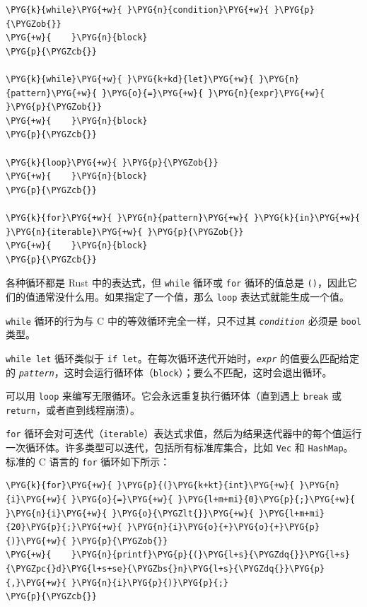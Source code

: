 \begin{Verbatim}[commandchars=\\\{\},breaklines=true,breakanywhere=true,fontsize=\codefont,xleftmargin=17bp]
\PYG{k}{while}\PYG{+w}{ }\PYG{n}{condition}\PYG{+w}{ }\PYG{p}{\PYGZob{}}
\PYG{+w}{    }\PYG{n}{block}
\PYG{p}{\PYGZcb{}}

\PYG{k}{while}\PYG{+w}{ }\PYG{k+kd}{let}\PYG{+w}{ }\PYG{n}{pattern}\PYG{+w}{ }\PYG{o}{=}\PYG{+w}{ }\PYG{n}{expr}\PYG{+w}{ }\PYG{p}{\PYGZob{}}
\PYG{+w}{    }\PYG{n}{block}
\PYG{p}{\PYGZcb{}}

\PYG{k}{loop}\PYG{+w}{ }\PYG{p}{\PYGZob{}}
\PYG{+w}{    }\PYG{n}{block}
\PYG{p}{\PYGZcb{}}

\PYG{k}{for}\PYG{+w}{ }\PYG{n}{pattern}\PYG{+w}{ }\PYG{k}{in}\PYG{+w}{ }\PYG{n}{iterable}\PYG{+w}{ }\PYG{p}{\PYGZob{}}
\PYG{+w}{    }\PYG{n}{block}
\PYG{p}{\PYGZcb{}}
\end{Verbatim}

各种循环都是 Rust 中的表达式，但 \texttt{while} 循环或 \texttt{for} 循环的值总是 \texttt{()}，因此它们的值通常没什么用。如果指定了一个值，那么 \texttt{loop} 表达式就能生成一个值。

\texttt{while} 循环的行为与 C 中的等效循环完全一样，只不过其 \emph{\texttt{condition}} 必须是 \texttt{bool} 类型。

\texttt{while let} 循环类似于 \texttt{if let}。在每次循环迭代开始时，\emph{\texttt{expr}} 的值要么匹配给定的 \emph{\texttt{pattern}}，这时会运行循环体（\texttt{block}）；要么不匹配，这时会退出循环。

可以用 \texttt{loop} 来编写无限循环。它会永远重复执行循环体（直到遇上 \texttt{break} 或 \texttt{return}，或者直到线程崩溃）。

\texttt{for} 循环会对可迭代（\texttt{iterable}）表达式求值，然后为结果迭代器中的每个值运行一次循环体。许多类型可以迭代，包括所有标准库集合，比如 \texttt{Vec} 和 \texttt{HashMap}。标准的 C 语言的 \texttt{for} 循环如下所示：

\begin{Verbatim}[commandchars=\\\{\},breaklines=true,breakanywhere=true,fontsize=\codefont,xleftmargin=17bp]
\PYG{k}{for}\PYG{+w}{ }\PYG{p}{(}\PYG{k+kt}{int}\PYG{+w}{ }\PYG{n}{i}\PYG{+w}{ }\PYG{o}{=}\PYG{+w}{ }\PYG{l+m+mi}{0}\PYG{p}{;}\PYG{+w}{ }\PYG{n}{i}\PYG{+w}{ }\PYG{o}{\PYGZlt{}}\PYG{+w}{ }\PYG{l+m+mi}{20}\PYG{p}{;}\PYG{+w}{ }\PYG{n}{i}\PYG{o}{+}\PYG{o}{+}\PYG{p}{)}\PYG{+w}{ }\PYG{p}{\PYGZob{}}
\PYG{+w}{    }\PYG{n}{printf}\PYG{p}{(}\PYG{l+s}{\PYGZdq{}}\PYG{l+s}{\PYGZpc{}d}\PYG{l+s+se}{\PYGZbs{}n}\PYG{l+s}{\PYGZdq{}}\PYG{p}{,}\PYG{+w}{ }\PYG{n}{i}\PYG{p}{)}\PYG{p}{;}
\PYG{p}{\PYGZcb{}}
\end{Verbatim}


